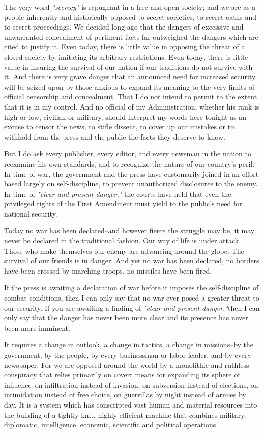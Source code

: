 \documentclass{article}
\begin{document}
The very word \emph{"secrecy"} is repugnant in a free and open society; and we are as a people inherently and historically opposed to secret societies, to secret oaths and to secret proceedings. We decided long ago that the dangers of excessive and unwarranted concealment of pertinent facts far outweighed the dangers which are cited to justify it. Even today, there is little value in opposing the threat of a closed society by imitating its arbitrary restrictions. Even today, there is little value in insuring the survival of our nation if our traditions do not survive with it. And there is very grave danger that an announced need for increased security will be seized upon by those anxious to expand its meaning to the very limits of official censorship and concealment. That I do not intend to permit to the extent that it is in my control. And no official of my Administration, whether his rank is high or low, civilian or military, should interpret my words here tonight as an excuse to censor the news, to stifle dissent, to cover up our mistakes or to withhold from the press and the public the facts they deserve to know.

But I do ask every publisher, every editor, and every newsman in the nation to reexamine his own standards, and to recognize the nature of our country's peril. In time of war, the government and the press have customarily joined in an effort based largely on self-discipline, to prevent unauthorized disclosures to the enemy. In time of \emph{"clear and present danger,"} the courts have held that even the privileged rights of the First Amendment must yield to the public's need for national security.

Today no war has been declared--and however fierce the struggle may be, it may never be declared in the traditional fashion. Our way of life is under attack. Those who make themselves our enemy are advancing around the globe. The survival of our friends is in danger. And yet no war has been declared, no borders have been crossed by marching troops, no missiles have been fired.

If the press is awaiting a declaration of war before it imposes the self-discipline of combat conditions, then I can only say that no war ever posed a greater threat to our security. If you are awaiting a finding of \emph{"clear and present danger,"}then I can only say that the danger has never been more clear and its presence has never been more imminent.

It requires a change in outlook, a change in tactics, a change in missions--by the government, by the people, by every businessman or labor leader, and by every newspaper. For we are opposed around the world by a monolithic and ruthless conspiracy that relies primarily on covert means for expanding its sphere of influence--on infiltration instead of invasion, on subversion instead of elections, on intimidation instead of free choice, on guerrillas by night instead of armies by day. It is a system which has conscripted vast human and material resources into the building of a tightly knit, highly efficient machine that combines military, diplomatic, intelligence, economic, scientific and political operations.
\end{document}

